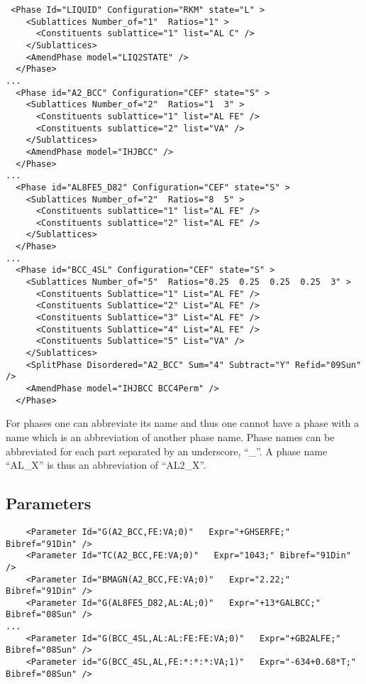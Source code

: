 \documentclass{article}
\begin{document}
\begin{appendices}
{\small
\begin{verbatim}
 <Phase Id="LIQUID" Configuration="RKM" state="L" >
    <Sublattices Number_of="1"  Ratios="1" >
      <Constituents sublattice="1" list="AL C" />
    </Sublattices>
    <AmendPhase model="LIQ2STATE" />
  </Phase>
...
  <Phase id="A2_BCC" Configuration="CEF" state="S" >
    <Sublattices Number_of="2"  Ratios="1  3" >
      <Constituents sublattice="1" list="AL FE" />
      <Constituents sublattice="2" list="VA" />
    </Sublattices>
    <AmendPhase model="IHJBCC" />
  </Phase>
...
  <Phase id="AL8FE5_D82" Configuration="CEF" state="S" >
    <Sublattices Number_of="2"  Ratios="8  5" >
      <Constituents sublattice="1" list="AL FE" />
      <Constituents sublattice="2" list="AL FE" />
    </Sublattices>
  </Phase>
...
  <Phase id="BCC_4SL" Configuration="CEF" state="S" >
    <Sublattices Number_of="5"  Ratios="0.25  0.25  0.25  0.25  3" >
      <Constituents Sublattice="1" List="AL FE" />
      <Constituents Sublattice="2" List="AL FE" />
      <Constituents Sublattice="3" List="AL FE" />
      <Constituents Sublattice="4" List="AL FE" />
      <Constituents Sublattice="5" List="VA" />
    </Sublattices>
    <SplitPhase Disordered="A2_BCC" Sum="4" Subtract="Y" Refid="09Sun" />
    <AmendPhase model="IHJBCC BCC4Perm" />
  </Phase>

\end{verbatim}
}


For phases one can abbreviate its name and thus one cannot have a
phase with a name which is an abbreviation of another phase name.
Phase names can be abbreviated for each part separated by an
underscore, ``\_''.  A phase name ``AL\_X'' is thus an abbreviation of
``AL2\_X''.


\newpage 

\subsection{Parameters}\label{sec:parameter examples}

{\small
\begin{verbatim}
    <Parameter Id="G(A2_BCC,FE:VA;0)"   Expr="+GHSERFE;" Bibref="91Din" />
    <Parameter Id="TC(A2_BCC,FE:VA;0)"   Expr="1043;" Bibref="91Din" />
    <Parameter Id="BMAGN(A2_BCC,FE:VA;0)"   Expr="2.22;" Bibref="91Din" />
    <Parameter Id="G(AL8FE5_D82,AL:AL;0)"   Expr="+13*GALBCC;" Bibref="08Sun" />
...
    <Parameter Id="G(BCC_4SL,AL:AL:FE:FE:VA;0)"   Expr="+GB2ALFE;" Bibref="08Sun" />
    <Parameter id="G(BCC_4SL,AL,FE:*:*:*:VA;1)"   Expr="-634+0.68*T;" Bibref="08Sun" />
\end{verbatim}
}


\end{appendices}
\end{document}
